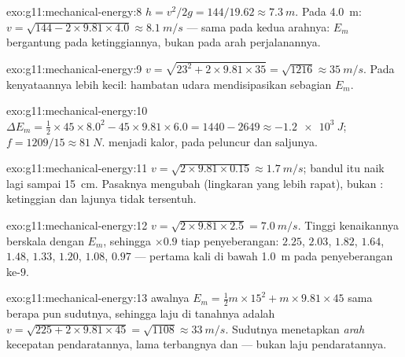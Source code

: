 \begin{solution}{exo:g11:mechanical-energy:8}
$h = v^2/2g = 144/19.62 \approx \qty{7.3}{m}$. Pada \qty{4.0}{m}:
$v = \sqrt{144 - 2 \times 9.81 \times 4.0} \approx \qty{8.1}{m/s}$ ---
sama pada kedua arahnya: $E_m$ bergantung pada ketinggiannya, bukan
pada arah perjalanannya.
\end{solution}

\begin{solution}{exo:g11:mechanical-energy:9}
$v = \sqrt{23^2 + 2 \times 9.81 \times 35} = \sqrt{1216} \approx
\qty{35}{m/s}$. Pada kenyataannya lebih kecil: hambatan udara
mendisipasikan sebagian $E_m$.
\end{solution}

\begin{solution}{exo:g11:mechanical-energy:10}
$\Delta E_m = \tfrac12 \times 45 \times 8.0^2 - 45 \times 9.81 \times
6.0 = 1440 - 2649 \approx \qty{-1.2e3}{J}$;
$f = 1209/15 \approx \qty{81}{N}$.  menjadi kalor, pada
peluncur dan saljunya.
\end{solution}

\begin{solution}{exo:g11:mechanical-energy:11}
$v = \sqrt{2 \times 9.81 \times 0.15} \approx \qty{1.7}{m/s}$; bandul
itu naik lagi sampai \qty{15}{cm}. Pasaknya mengubah 
(lingkaran yang lebih rapat), bukan : ketinggian dan lajunya
tidak tersentuh.
\end{solution}

\begin{solution}{exo:g11:mechanical-energy:12}
$v = \sqrt{2 \times 9.81 \times 2.5} = \qty{7.0}{m/s}$. Tinggi
kenaikannya berskala dengan $E_m$, sehingga $\times 0.9$ tiap
penyeberangan: $2.25$, $2.03$, $1.82$, $1.64$, $1.48$, $1.33$, $1.20$,
$1.08$, $0.97$ --- pertama kali di bawah \qty{1.0}{m} pada
penyeberangan ke-$9$.
\end{solution}

\begin{solution}{exo:g11:mechanical-energy:13}
 awalnya $E_m = \tfrac12 m \times 15^2 + m \times 9.81 \times 45$
sama berapa pun sudutnya, sehingga laju di tanahnya adalah
$v = \sqrt{225 + 2 \times 9.81 \times 45} = \sqrt{1108} \approx
\qty{33}{m/s}$. Sudutnya menetapkan \emph{arah} kecepatan
pendaratannya, lama terbangnya dan  --- bukan laju
pendaratannya.
\end{solution}

